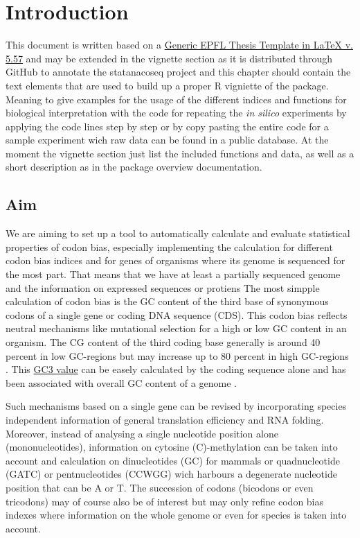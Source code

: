 \chapter*{Introduction}
This document is written based on a \href{http://phd.epfl.ch/thesistemplates}{Generic EPFL Thesis Template in LaTeX v. 5.57} and may be extended in the vignette section as it is distributed through GitHub to annotate the statanacoseq project and this chapter should contain the text elements that are used to build up a proper R vigniette of the package. Meaning to give examples for the usage of the different indices and functions for biological interpretation with the code for repeating the \textit{in silico} experiments by applying the code lines step by step or by copy pasting the entire code for a sample experiment wich raw data can be found in a public database. At the moment the vignette section just list the included functions and data, as well as a short description as in the package overview documentation.

\section{Aim}
We are aiming to set up a tool to automatically calculate and evaluate statistical properties of codon bias, especially implementing the calculation for different codon bias indices and for genes of organisms where its genome is sequenced for the most part. That means that we have at least a partially sequenced genome and the information on expressed sequences or protiens
The most simpple calculation of codon bias is the GC content of the third base of synonymous codons of a single gene or coding DNA sequence (CDS). This codon bias reflects neutral mechanisms like mutational selection for a high or low GC content in an organism. The CG content of the third coding base generally is around 40 percent in low GC-regions but may increase up to 80 percent in high GC-regions \cite{Galtier2001}. This \hyperlink{function:G3C}{GC3 value} can be easely calculated by the coding sequence alone and has been associated with overall GC content of a genome \cite{Muto1987}.

Such mechanisms based on a single gene can be revised by incorporating species independent information of general translation efficiency and RNA folding. Moreover, instead of analysing a single nucleotide position alone (mononucleotides), information on cytosine (C)-methylation can be taken into account and calculation on dinucleotides (GC) for mammals or quadnucleotide (GATC) or pentnucleotides (CCWGG) wich harbours a degenerate nucleotide position that can be A or T. The succession of codons (bicodons or even tricodons) may of course also be of interest but may only refine codon bias indexes where information on the whole genome or even for species is taken into account.

